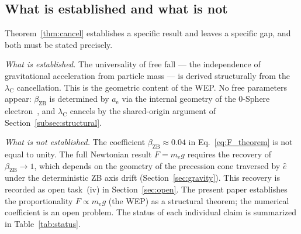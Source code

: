 \documentclass[%
 reprint, amsmath,amssymb, aps, prb, ]{revtex4-2}
\numberwithin{equation}{section}
\newcommand{\lambdaC}{\lambda_{\mathrm{C}}}
\newcommand{\betaZB}{\beta_{\mathrm{ZB}}}
\newcommand{\anom}{a_{\mathrm{e}}}
\begin{document}
\subsection{What is established and what is not}
\label{subsec:scope}

Theorem~\ref{thm:cancel} establishes a specific result and leaves a specific gap, and both must be stated precisely.

\textit{What is established.}
The universality of free fall --- the independence of gravitational acceleration from particle mass --- is derived structurally from the $\lambdaC$ cancellation.
This is the geometric content of the WEP.
No free parameters appear: $\betaZB$ is determined by $\anom$ via the internal geometry of the 0-Sphere electron~\cite{hanamura10,hanamura47}, and $\lambdaC$ cancels by the shared-origin argument of Section~\ref{subsec:structural}.

\textit{What is not established.}
The coefficient $\betaZB \approx 0.04$ in Eq.~\eqref{eq:F_theorem} is not equal to unity.
The full Newtonian result $F = m_e g$ requires the recovery of $\betaZB \to 1$, which depends on the geometry of the precession cone traversed by $\hat{e}$ under the deterministic ZB axis drift (Section~\ref{sec:gravity}).
This recovery is recorded as open task~(iv) in Section~\ref{sec:open}.
The present paper establishes the proportionality $F \propto m_e g$ (the WEP) as a structural theorem; the numerical coefficient is an open problem.
The status of each individual claim is summarized in Table~\ref{tab:status}.
\end{document}
